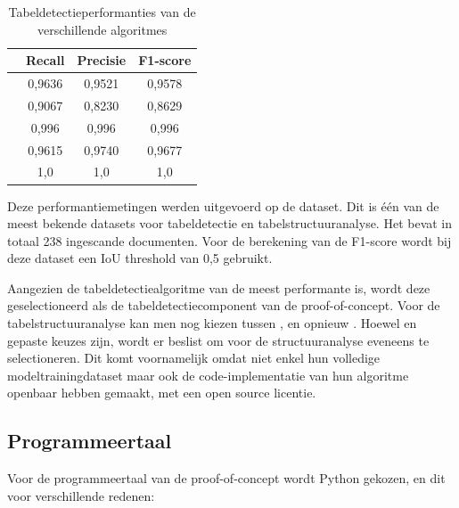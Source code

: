 \begin{table}[H]
\centering
\begin{tabular}{@{}lccc@{}}
\toprule
                           & \Gls{Recall} & \Gls{Precisie} & \Gls{F1-score} \\ \midrule
\citeauthor{Tran2015}      & 0,9636       & 0,9521         & 0,9578         \\ \midrule
\citeauthor{Gilani2017}    & 0,9067       & 0,8230         & 0,8629         \\ \midrule
\citeauthor{Siddiqui2018}  & 0,996        & 0,996          & 0,996          \\ \midrule
\citeauthor{Schreiber2017} & 0,9615       & 0,9740         & 0,9677         \\ \midrule
\citeauthor{Prasad2020}    & 1,0          & 1,0            & 1,0            \\ \bottomrule
\end{tabular}
\caption{Tabeldetectieperformanties van de verschillende algoritmes}
\label{tab:tabel-detectie-performanties}
\end{table}

Deze performantiemetingen werden uitgevoerd op de  dataset. Dit is één van de meest bekende datasets voor tabeldetectie en tabelstructuuranalyse. Het bevat in totaal 238 ingescande documenten. Voor de berekening van de \Gls{F1-score} wordt bij deze dataset een \Gls{IoU} threshold van 0,5 gebruikt.

Aangezien de tabeldetectiealgoritme van \textcite{Prasad2020} de meest performante is, wordt deze geselectioneerd als de tabeldetectiecomponent van de proof-of-concept. Voor de tabelstructuuranalyse kan men nog kiezen tussen \autocite{Qasim2019}, \autocite{Schreiber2017} en opnieuw \autocite{Prasad2020}. Hoewel \autocite{Qasim2019} en \autocite{Schreiber2017} gepaste keuzes zijn, wordt er beslist om voor de structuuranalyse eveneens \autocite{Prasad2020} te selectioneren. Dit komt voornamelijk omdat \textcite{Prasad2020} niet enkel hun volledige modeltrainingdataset maar ook de code-implementatie van hun algoritme openbaar hebben gemaakt, met een open source licentie.

\subsection{Programmeertaal}

Voor de programmeertaal van de proof-of-concept wordt Python \autocite{VanRossum2009} gekozen, en dit voor verschillende redenen:

